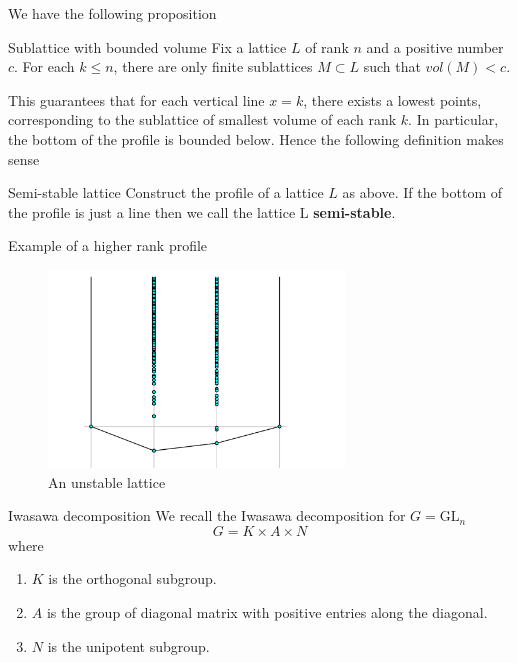 \documentclass[pdf]{beamer}
\begin{document}
\begin{frame}
    We have the following proposition
    \begin{block}{Sublattice with bounded volume}
        Fix a lattice $L$ of rank $n$ and a positive number $c$. For each $k \le n$, there are only finite sublattices $M \subset L$ such that
        $vol(M) <c$.
    \end{block} \pause

    This guarantees that for each vertical line $x = k$, there exists a lowest points, corresponding to the sublattice of smallest volume of each rank $k$.
    In particular, the bottom of the profile is bounded below. Hence the following definition makes sense \pause
    \begin{block}{Semi-stable lattice}
        Construct the profile of a lattice $L$ as above. If the bottom of the profile is just a line
        then we call the lattice L \textbf{semi-stable}.
    \end{block}
\end{frame}
\begin{frame}{Example of a higher rank profile}
    \centering
    \begin{figure}
        \includegraphics[width = 0.7\textwidth]{Canonical plot 3 dim.png}
        \caption{An unstable lattice}
    \end{figure}
\end{frame}
\begin{frame}{Iwasawa decomposition}
    We recall the Iwasawa decomposition for $G =\text{GL}_n$
    \[G = K \times A \times N\]
    where
    \begin{enumerate}
        \item $K$ is the orthogonal subgroup.
        \item $A$ is the group of diagonal matrix with positive entries along the diagonal.
        \item $N$ is the unipotent subgroup.
    \end{enumerate}
\end{frame}
\end{document}
